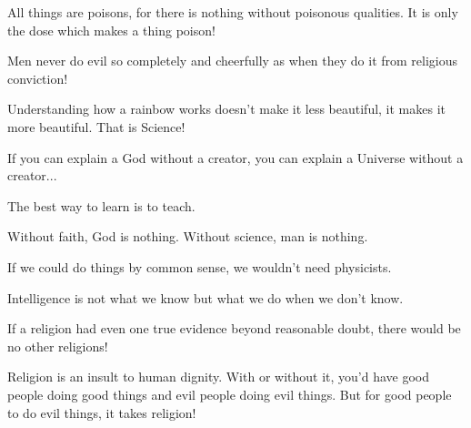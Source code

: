  	\begin{fquote}[Paracelsus]All things are poisons, for there is nothing without poisonous qualities. It is only the dose which makes a thing poison!
 	\end{fquote}
 	
 	\begin{fquote}Men never do evil so completely and cheerfully as when they do it from religious conviction!
 	\end{fquote}
 	
 	\begin{fquote}Understanding how a rainbow works doesn't make it less beautiful, it makes it more beautiful. That is Science!
 	\end{fquote}
 	
 	\begin{fquote}If you can explain a God without a creator, you can explain a Universe without a creator...
 	\end{fquote}
 	
	\begin{fquote}The best way to learn is to teach.
 	\end{fquote}
 	
	\begin{fquote}Without faith, God is nothing. Without science, man is nothing.
 	\end{fquote}
 	
 	\begin{fquote}If we could do things by common sense, we wouldn't need physicists.
 	\end{fquote}
 	
 	\begin{fquote}Intelligence is not what we know but what we do when we don't know.
 	\end{fquote}
 	
 	\begin{fquote}If a religion had even one true evidence beyond reasonable doubt, there would be no other religions!
 	\end{fquote}
 	
 	\begin{fquote}Religion is an insult to human dignity. With or without it, you'd have good people doing good things and evil people doing evil things. But for good people to do evil things, it takes religion!
 	\end{fquote}
 	
